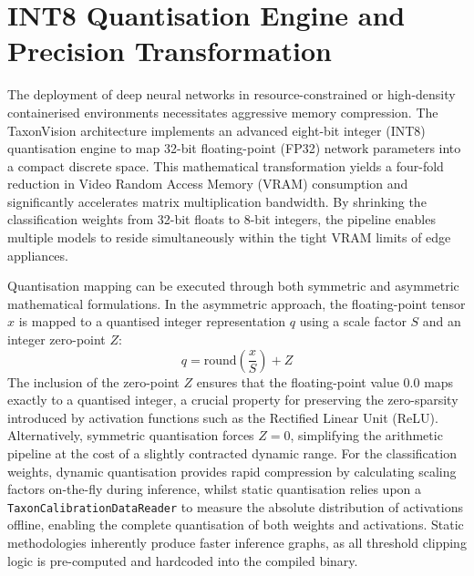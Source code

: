 \section{INT8 Quantisation Engine and Precision Transformation}
\label{sec:quantization_and_cam}

The deployment of deep neural networks in resource-constrained or high-density containerised environments necessitates aggressive memory compression. The TaxonVision architecture implements an advanced eight-bit integer (INT8) quantisation engine to map 32-bit floating-point (FP32) network parameters into a compact discrete space. This mathematical transformation yields a four-fold reduction in Video Random Access Memory (VRAM) consumption and significantly accelerates matrix multiplication bandwidth. By shrinking the classification weights from 32-bit floats to 8-bit integers, the pipeline enables multiple models to reside simultaneously within the tight VRAM limits of edge appliances.

Quantisation mapping can be executed through both symmetric and asymmetric mathematical formulations. In the asymmetric approach, the floating-point tensor $x$ is mapped to a quantised integer representation $q$ using a scale factor $S$ and an integer zero-point $Z$:
\begin{equation}
    q = \text{round}\left(\frac{x}{S}\right) + Z
\end{equation}
The inclusion of the zero-point $Z$ ensures that the floating-point value $0.0$ maps exactly to a quantised integer, a crucial property for preserving the zero-sparsity introduced by activation functions such as the Rectified Linear Unit (ReLU). Alternatively, symmetric quantisation forces $Z=0$, simplifying the arithmetic pipeline at the cost of a slightly contracted dynamic range. For the classification weights, dynamic quantisation provides rapid compression by calculating scaling factors on-the-fly during inference, whilst static quantisation relies upon a \texttt{TaxonCalibrationDataReader} to measure the absolute distribution of activations offline, enabling the complete quantisation of both weights and activations. Static methodologies inherently produce faster inference graphs, as all threshold clipping logic is pre-computed and hardcoded into the compiled binary.

